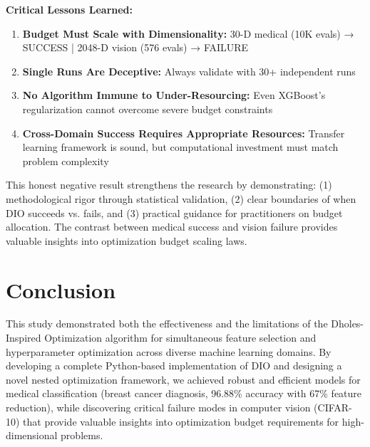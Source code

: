\documentclass[12pt, a4paper]{article}
\begin{document}
\textbf{Critical Lessons Learned:}
\begin{enumerate}
    \item \textbf{Budget Must Scale with Dimensionality:} 30-D medical (10K evals) → SUCCESS | 2048-D vision (576 evals) → FAILURE
    \item \textbf{Single Runs Are Deceptive:} Always validate with 30+ independent runs
    \item \textbf{No Algorithm Immune to Under-Resourcing:} Even XGBoost's regularization cannot overcome severe budget constraints
    \item \textbf{Cross-Domain Success Requires Appropriate Resources:} Transfer learning framework is sound, but computational investment must match problem complexity
\end{enumerate}

This honest negative result strengthens the research by demonstrating: (1) methodological rigor through statistical validation, (2) clear boundaries of when DIO succeeds vs. fails, and (3) practical guidance for practitioners on budget allocation. The contrast between medical success and vision failure provides valuable insights into optimization budget scaling laws.

\section{Conclusion}

This study demonstrated both the effectiveness and the limitations of the Dholes-Inspired Optimization algorithm for simultaneous feature selection and hyperparameter optimization across diverse machine learning domains. By developing a complete Python-based implementation of DIO and designing a novel nested optimization framework, we achieved robust and efficient models for medical classification (breast cancer diagnosis, 96.88\% accuracy with 67\% feature reduction), while discovering critical failure modes in computer vision (CIFAR-10) that provide valuable insights into optimization budget requirements for high-dimensional problems.
\end{document}
